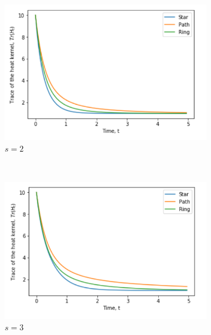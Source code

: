 \documentclass[10pt,a4paper]{article}
\begin{document}
        \begin{figure}[H]
        	\centering
        	\begin{subfigure}[b]{0.35\textwidth}
        		\includegraphics[width= \textwidth]{images/graphskernelmellin2.png}
        		\caption{$s=2$}
        		\label{threegraphMellin2}
        	\end{subfigure}~
        	\begin{subfigure}[b]{0.35\textwidth}
        		\includegraphics[width= \textwidth]{images/graphskernelmellin3.png}
        		\caption{$s=3$}
        		\label{threegraphMellin3}
        	\end{subfigure} \\
        	\begin{subfigure}[b]{0.35\textwidth}

\end{subfigure}
\end{figure}
\end{document}
